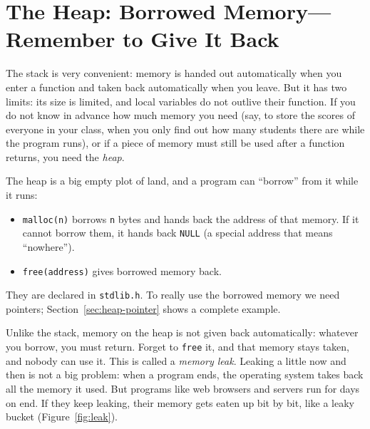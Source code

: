 \section{The Heap: Borrowed Memory---Remember to Give It Back}
\label{sec:heap}

The stack is very convenient: memory is handed out automatically when you enter a function and taken back automatically when you leave. But it has two limits: its size is limited, and local variables do not outlive their function. If you do not know in advance how much memory you need (say, to store the scores of everyone in your class, when you only find out how many students there are while the program runs), or if a piece of memory must still be used after a function returns, you need the \emph{heap}.

The heap is a big empty plot of land, and a program can ``borrow'' from it while it runs:
\begin{itemize}
  \item \texttt{malloc(n)} borrows \texttt{n} bytes and hands back the address of that memory. If it cannot borrow them, it hands back \texttt{NULL} (a special address that means ``nowhere'').
  \item \texttt{free(address)} gives borrowed memory back.
\end{itemize}
They are declared in \texttt{stdlib.h}. To really use the borrowed memory we need pointers; Section~\ref{sec:heap-pointer} shows a complete example.

Unlike the stack, memory on the heap is not given back automatically: whatever you borrow, you must return. Forget to \texttt{free} it, and that memory stays taken, and nobody can use it. This is called a \emph{memory leak}. Leaking a little now and then is not a big problem: when a program ends, the operating system takes back all the memory it used. But programs like web browsers and servers run for days on end. If they keep leaking, their memory gets eaten up bit by bit, like a leaky bucket (Figure~\ref{fig:leak}).

